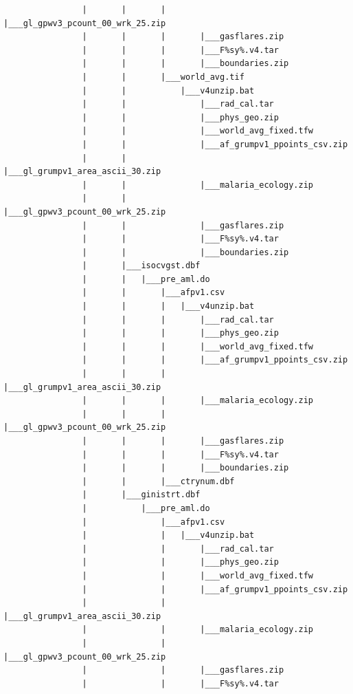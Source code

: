 \documentclass[]{book}
\begin{document}
\begin{verbatim}
                |       |       |       |___gl_gpwv3_pcount_00_wrk_25.zip
                |       |       |       |___gasflares.zip
                |       |       |       |___F%sy%.v4.tar
                |       |       |       |___boundaries.zip
                |       |       |___world_avg.tif
                |       |           |___v4unzip.bat
                |       |               |___rad_cal.tar
                |       |               |___phys_geo.zip
                |       |               |___world_avg_fixed.tfw
                |       |               |___af_grumpv1_ppoints_csv.zip
                |       |               |___gl_grumpv1_area_ascii_30.zip
                |       |               |___malaria_ecology.zip
                |       |               |___gl_gpwv3_pcount_00_wrk_25.zip
                |       |               |___gasflares.zip
                |       |               |___F%sy%.v4.tar
                |       |               |___boundaries.zip
                |       |___isocvgst.dbf
                |       |   |___pre_aml.do
                |       |       |___afpv1.csv
                |       |       |   |___v4unzip.bat
                |       |       |       |___rad_cal.tar
                |       |       |       |___phys_geo.zip
                |       |       |       |___world_avg_fixed.tfw
                |       |       |       |___af_grumpv1_ppoints_csv.zip
                |       |       |       |___gl_grumpv1_area_ascii_30.zip
                |       |       |       |___malaria_ecology.zip
                |       |       |       |___gl_gpwv3_pcount_00_wrk_25.zip
                |       |       |       |___gasflares.zip
                |       |       |       |___F%sy%.v4.tar
                |       |       |       |___boundaries.zip
                |       |       |___ctrynum.dbf
                |       |___ginistrt.dbf
                |           |___pre_aml.do
                |               |___afpv1.csv
                |               |   |___v4unzip.bat
                |               |       |___rad_cal.tar
                |               |       |___phys_geo.zip
                |               |       |___world_avg_fixed.tfw
                |               |       |___af_grumpv1_ppoints_csv.zip
                |               |       |___gl_grumpv1_area_ascii_30.zip
                |               |       |___malaria_ecology.zip
                |               |       |___gl_gpwv3_pcount_00_wrk_25.zip
                |               |       |___gasflares.zip
                |               |       |___F%sy%.v4.tar

\end{verbatim}
\end{document}
